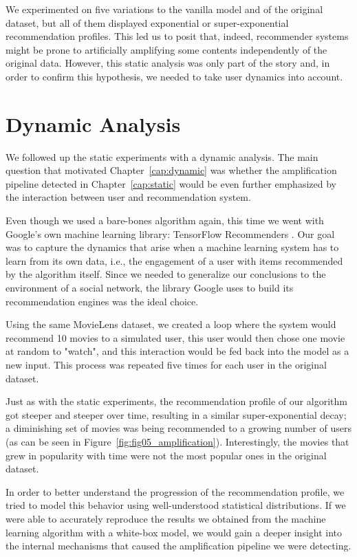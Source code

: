 We experimented on five variations to the vanilla model and of the original
dataset, but all of them displayed exponential or super-exponential
recommendation profiles. This led us to posit that, indeed, recommender systems
might be prone to artificially amplifying some contents independently of the
original data. However, this static analysis was only part of the story and, in
order to confirm this hypothesis, we needed to take user dynamics into account.

\section{Dynamic Analysis}
\label{sec:dynamic}

We followed up the static experiments with a dynamic analysis. The main
question that motivated Chapter~\ref{cap:dynamic} was whether the amplification
pipeline detected in Chapter~\ref{cap:static} would be even further emphasized
by the interaction between user and recommendation system.

Even though we used a bare-bones algorithm again, this time we went with
Google's own machine learning library: TensorFlow Recommenders
\citep{noauthor_tensorflow_nodate}. Our goal was to capture the dynamics that
arise when a machine learning system has to learn from its own data, i.e., the
engagement of a user with items recommended by the algorithm itself. Since we
needed to generalize our conclusions to the environment of a social network, the
library Google uses to build its recommendation engines was the ideal choice.

Using the same MovieLens \citep{harper_movielens_2015} dataset, we created a
loop where the system would recommend 10 movies to a simulated user, this user
would then chose one movie at random to "watch", and this interaction would be
fed back into the model as a new input. This process was repeated five times for
each user in the original dataset.

Just as with the static experiments, the recommendation profile of our algorithm
got steeper and steeper over time, resulting in a similar super-exponential
decay; a diminishing set of movies was being recommended to a growing number of
users (as can be seen in Figure~\ref{fig:fig05_amplification}). Interestingly,
the movies that grew in popularity with time were not the most popular ones in
the original dataset.

In order to better understand the progression of the recommendation profile, we
tried to model this behavior using well-understood statistical distributions. If
we were able to accurately reproduce the results we obtained from the machine
learning algorithm with a white-box model, we would gain a deeper insight into
the internal mechanisms that caused the amplification pipeline we were
detecting.

